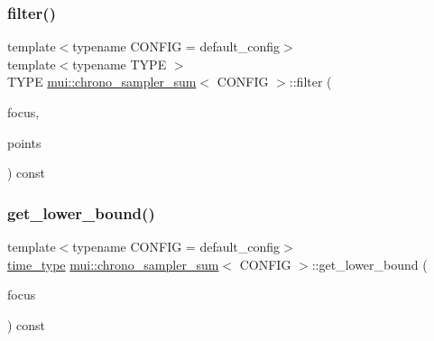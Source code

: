 \subsubsection{\texorpdfstring{filter()}{filter()}}
{\footnotesize\ttfamily template$<$typename C\+O\+N\+F\+IG  = default\+\_\+config$>$ \\
template$<$typename T\+Y\+PE $>$ \\
T\+Y\+PE \hyperlink{classmui_1_1chrono__sampler__sum}{mui\+::chrono\+\_\+sampler\+\_\+sum}$<$ C\+O\+N\+F\+IG $>$\+::filter (\begin{DoxyParamCaption}\item[{\hyperlink{classmui_1_1chrono__sampler__sum_ada1a39bc0845e79c00e7aed8b55e8fb2}{time\+\_\+type}}]{focus,  }\item[{const std\+::vector$<$ std\+::pair$<$ \hyperlink{classmui_1_1chrono__sampler__sum_ada1a39bc0845e79c00e7aed8b55e8fb2}{time\+\_\+type}, T\+Y\+PE $>$ $>$ \&}]{points }\end{DoxyParamCaption}) const\hspace{0.3cm}{\ttfamily [inline]}}

\mbox{\label{classmui_1_1chrono__sampler__sum_a197cfd23da3c02957e466a4aace52bcb}} 
\subsubsection{\texorpdfstring{get\+\_\+lower\+\_\+bound()}{get\_lower\_bound()}}
{\footnotesize\ttfamily template$<$typename C\+O\+N\+F\+IG  = default\+\_\+config$>$ \\
\hyperlink{classmui_1_1chrono__sampler__sum_ada1a39bc0845e79c00e7aed8b55e8fb2}{time\+\_\+type} \hyperlink{classmui_1_1chrono__sampler__sum}{mui\+::chrono\+\_\+sampler\+\_\+sum}$<$ C\+O\+N\+F\+IG $>$\+::get\+\_\+lower\+\_\+bound (\begin{DoxyParamCaption}\item[{\hyperlink{classmui_1_1chrono__sampler__sum_ada1a39bc0845e79c00e7aed8b55e8fb2}{time\+\_\+type}}]{focus }\end{DoxyParamCaption}) const\hspace{0.3cm}{\ttfamily [inline]}}

\mbox{\label{classmui_1_1chrono__sampler__sum_ad63fb80d5015358d609b91cf8707ab97}} 
